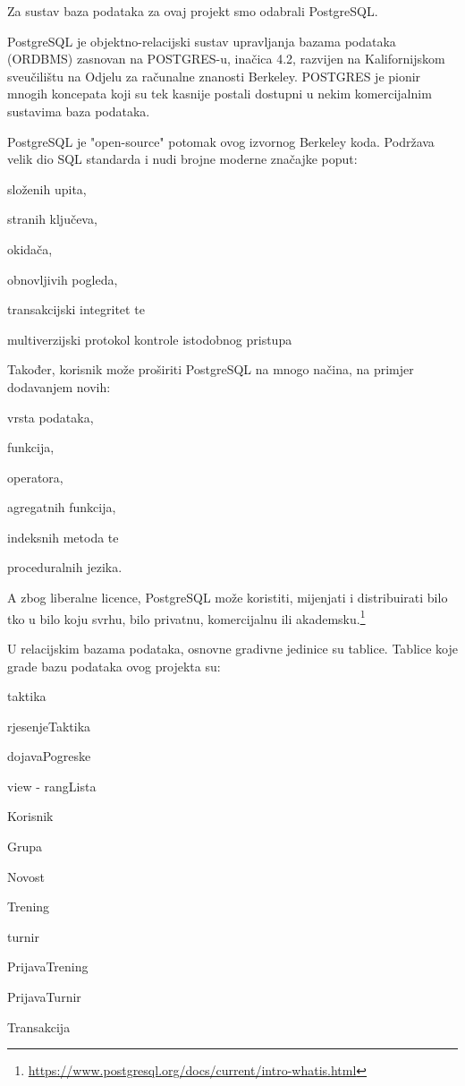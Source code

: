 		Za sustav baza podataka za ovaj projekt smo odabrali PostgreSQL. 
		
		PostgreSQL je objektno-relacijski sustav upravljanja bazama podataka (ORDBMS) zasnovan na POSTGRES-u, inačica 4.2, razvijen na Kalifornijskom sveučilištu na Odjelu za računalne znanosti Berkeley. POSTGRES je pionir mnogih koncepata koji su tek kasnije postali dostupni u nekim komercijalnim sustavima baza podataka.
		
		PostgreSQL je "open-source" potomak ovog izvornog Berkeley koda. Podržava velik dio SQL standarda i nudi brojne moderne značajke poput:
		\begin{packed_item}
			\item složenih upita,
			\item stranih ključeva,
			\item okidača,
			\item obnovljivih pogleda,
			\item transakcijski integritet te
			\item multiverzijski protokol kontrole istodobnog
			pristupa
		\end{packed_item}
		
		Također, korisnik može proširiti PostgreSQL na mnogo načina, na primjer dodavanjem novih:
		\begin{packed_item}
			\item vrsta podataka,
			\item funkcija,
			\item operatora,
			\item agregatnih funkcija,
			\item indeksnih metoda te
			\item proceduralnih jezika.
		\end{packed_item}
		
		
		A zbog liberalne licence, PostgreSQL može koristiti, mijenjati i distribuirati bilo tko u bilo koju svrhu, bilo privatnu, komercijalnu ili akademsku.\footnote{\url{https://www.postgresql.org/docs/current/intro-whatis.html}}
		
		U relacijskim bazama podataka, osnovne gradivne jedinice su tablice. Tablice koje grade bazu podataka ovog projekta su:
		\begin{packed_item}
			\item taktika
			\item rjesenjeTaktika
			\item dojavaPogreske
			\item view - rangLista
			\item Korisnik
			\item Grupa
			\item Novost
			\item Trening
			\item turnir
			\item PrijavaTrening
			\item PrijavaTurnir
			\item Transakcija
			
		\end{packed_item}
		
